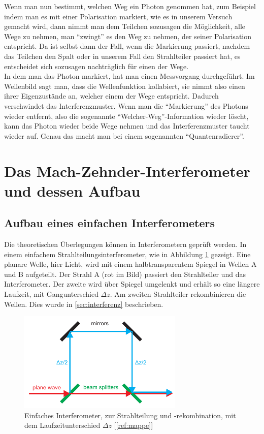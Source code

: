\documentclass[a4paper,ngerman]{scrartcl}
\begin{document}
Wenn man nun bestimmt, welchen Weg ein Photon genommen hat, zum Beispiel indem man es mit einer Polarisation markiert, wie es in unserem Versuch gemacht wird, dann nimmt man dem Teilchen sozusagen die Möglichkeit, alle Wege zu nehmen, man "`zwingt"' es den Weg zu nehmen, der seiner 
Polarisation entspricht. Da ist selbst dann der Fall, wenn die Markierung passiert, nachdem das Teilchen den Spalt oder in unserem Fall den Strahlteiler passiert hat, es entscheidet sich sozusagen nachträglich für einen der Wege.\\

In dem man das Photon markiert, hat man einen Messvorgang durchgeführt. Im Wellenbild sagt man, dass die Wellenfunktion kollabiert, sie nimmt also einen ihrer Eigenzustände an, welcher einem der Wege entspricht. Dadurch verschwindet das Interferenzmuster. Wenn man die "`Markierung"' des Photons wieder entfernt, also die sogenannte "`Welcher-Weg"'-Information wieder löscht, kann das Photon wieder beide Wege nehmen und das Interferenzmuster taucht wieder auf. Genau das macht man bei einem sogenannten "`Quantenradierer"'.

\clearpage
\section{Das Mach-Zehnder-Interferometer und dessen Aufbau}
\label{sec:mach-zehnder}

\subsection{Aufbau eines einfachen Interferometers}
\label{ssec:interferomter-einfach}

Die theoretischen Überlegungen können in Interferometern geprüft werden. 
In einem einfachem Strahlteilungsinterferometer, wie in Abbildung \ref{fig: Interferometer-einfach} gezeigt. 
Eine planare Welle, hier Licht, wird mit einem halbtransparentem Spiegel in Wellen A und B aufgeteilt. Der Strahl A (rot im Bild) passiert den Strahlteiler und das Interferometer. 
Der zweite wird über Spiegel umgelenkt und erhält so eine längere Laufzeit, mit Gangunterschied $\Delta z$. 
Am zweiten Strahlteiler rekombinieren die Wellen. Dies wurde in \ref{sec:interferenz} beschrieben.

\begin{figure}
\includegraphics[width=0.7\textwidth]{interferomter-einfach.png}
\caption{Einfaches Interferometer, zur Strahlteilung und -rekombination, mit dem Laufzeitunterschied $\Delta z$ [\ref{ref:mappe}]}
\label{fig: Interferometer-einfach}
\end{figure}
\end{document}
